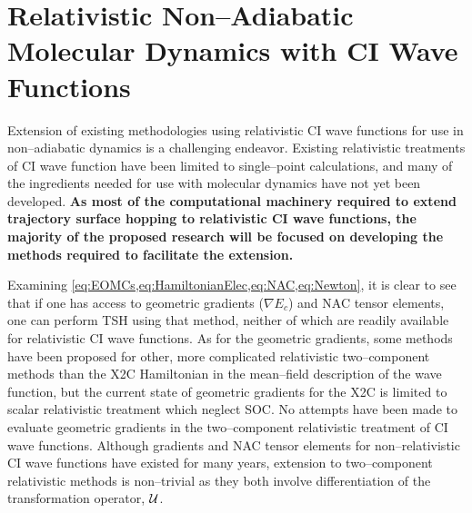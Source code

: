 \linespread{1.0}
\section{Relativistic Non--Adiabatic Molecular Dynamics with CI Wave Functions}
\mylinesp
\label{sec:Future}

Extension of existing methodologies using relativistic CI wave functions for use
in non--adiabatic dynamics is a challenging endeavor. Existing relativistic
treatments of CI wave function have been limited to single--point calculations,
and many of the ingredients needed for use with molecular dynamics have not yet
been developed.
{\bf As most of the computational machinery required to extend trajectory
surface hopping to relativistic CI wave functions, the majority of the proposed
research will be focused on developing the methods required to facilitate the
extension.}

Examining \cref{eq:EOMCs,eq:HamiltonianElec,eq:NAC,eq:Newton}, it is clear to
see that if one has access to geometric gradients ($\nabla E_c$) and NAC tensor
elements, one can perform TSH using that method, neither of which are readily
available for relativistic CI wave functions. As for the geometric gradients,
some methods have been proposed for other, more complicated relativistic
two--component methods\cite{Nakai16_JCTC2181,Cremer15_JCP214106} than the X2C
Hamiltonian in the mean--field description of the wave function, but the current
state of geometric gradients for the X2C is limited to scalar relativistic
treatment which neglect SOC\cite{Gauss11_JCP084114}. No attempts have been made
to evaluate geometric gradients in the two--component relativistic treatment of
CI wave functions. Although gradients and NAC tensor elements for
non--relativistic CI wave functions have existed for many years, extension to
two--component relativistic methods is non--trivial as they both involve
differentiation of the transformation operator, $\mathcal{U}$.

